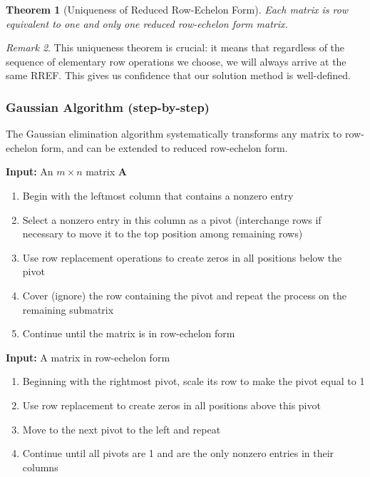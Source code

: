 \documentclass[12pt]{article}
\numberwithin{equation}{section}
\newcommand{\mat}[1]{\mathbf{#1}}        %
\theoremstyle{plain}
\newtheorem{theorem}{Theorem}[section]
\theoremstyle{definition}
\theoremstyle{remark}
\newtheorem{remark}[theorem]{Remark}
\begin{document}
\begin{theorem}[Uniqueness of Reduced Row-Echelon Form]
Each matrix is row equivalent to one and only one reduced row-echelon form matrix.
\end{theorem}

\begin{remark}
This uniqueness theorem is crucial: it means that regardless of the sequence of elementary row operations we choose, we will always arrive at the same RREF. This gives us confidence that our solution method is well-defined.
\end{remark}

\subsubsection{Gaussian Algorithm (step-by-step)}

The Gaussian elimination algorithm systematically transforms any matrix to row-echelon form, and can be extended to reduced row-echelon form.

\begin{algorithm}[H]
\caption{Gaussian Elimination to REF}
\textbf{Input:} An $m \times n$ matrix $\mat{A}$
\begin{enumerate}
\item Begin with the leftmost column that contains a nonzero entry
\item Select a nonzero entry in this column as a pivot (interchange rows if necessary to move it to the top position among remaining rows)
\item Use row replacement operations to create zeros in all positions below the pivot
\item Cover (ignore) the row containing the pivot and repeat the process on the remaining submatrix
\item Continue until the matrix is in row-echelon form
\end{enumerate}
\end{algorithm}

\begin{algorithm}[H]
\caption{Gauss-Jordan Elimination to RREF}
\textbf{Input:} A matrix in row-echelon form
\begin{enumerate}
\item Beginning with the rightmost pivot, scale its row to make the pivot equal to 1
\item Use row replacement to create zeros in all positions above this pivot
\item Move to the next pivot to the left and repeat
\item Continue until all pivots are 1 and are the only nonzero entries in their columns
\end{enumerate}
\end{algorithm}
\end{document}
